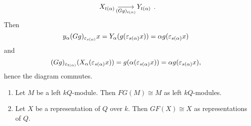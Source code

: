 \begin{rem}
\begin{enumerate}
\begin{itemize}
\[\begin{tikzcd}
      X_{t(\alpha)}\ar[swap]{r}{(Gg)_{t(\alpha)}}&Y_{t(\alpha)}
      \end{tikzcd}.
      \]
      Then
      \[
      y_{\alpha}(Gg)_{\varepsilon_{s(\alpha)}}x=Y_{\alpha}(g(\varepsilon_{s(\alpha)}x))=\alpha g(\varepsilon_{s(\alpha)}x)\]
      and
      \[
      (Gg)_{\varepsilon_{t(\alpha)}}(X_{\alpha}(\varepsilon_{s(\alpha)}x)) = g(\alpha(\varepsilon_{s(\alpha)}x)) = \alpha g(\varepsilon_{s(\alpha)}x),
      \]
      hence the diagram commutes.
    \end{itemize}
  \end{enumerate}
\end{rem}

\begin{thm}\label{3:eqcat}
  \begin{enumerate}
    \item Let $M$ be a left $kQ$-module. Then $FG(M)\cong M$ as left $kQ$-modules.
    \item Let $X$ be a representation of $Q$ over $k$. Then $GF(X)\cong X$ as representations of $Q$.
  \end{enumerate}
\end{thm}

